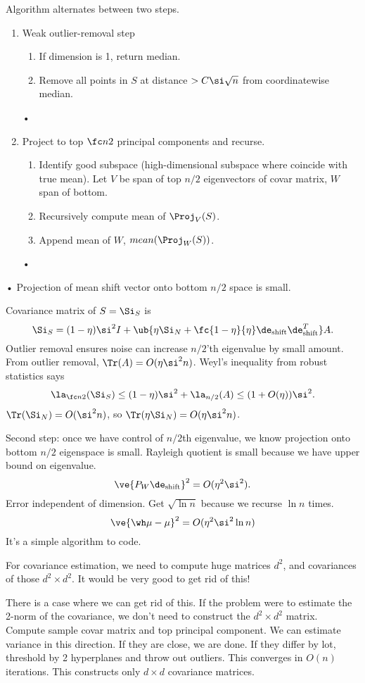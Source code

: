 Algorithm alternates between two steps.
\begin{enumerate}
\item
Weak outlier-removal step
\begin{enumerate}
\item
If dimension is 1, return median.
\item
Remove all points in $S$ at distance $>C\si \sqrt n$ from coordinatewise median. 
\end{enumerate}•
\item
Project to top $\fc n2$ principal components and recurse.
\begin{enumerate}
\item
Identify good subspace (high-dimensional subspace where coincide with true mean). Let $V$ be span of top $n/2$ eigenvectors of covar matrix, $W$ span of bottom. \item
Recursively compute mean of $\Proj_V(S)$.
\item
 Append mean of $W$, $mean(\Proj_W(S))$. 
\end{enumerate}•
\end{enumerate}•
Projection of mean shift vector onto bottom $n/2$ space is small.

Covariance matrix of $S=\Si_S$ is
$$
\Si_S = (1-\eta)\si^2 I + \ub{\eta \Si_N + \fc{1-\eta}{\eta} \de_{\text{shift}}\de_{\text{shift}}^T}A.
$$
Outlier removal ensures noise can increase $n/2$'th eigenvalue by small amount. 
From outlier removal, $\Tr(A)=O(\eta\si^2n)$.
Weyl's inequality from robust statistics says
$$
\la_{\fc n2}(\Si_S) \le (1-\eta)\si^2 + \la_{n/2}(A)
\le (1+O(\eta))\si^2.
$$
$\Tr(\Si_N) = O(\si^2n)$, so $\Tr(\eta\Si_N) = O(\eta\si^2n)$. 

Second step: once we have control of $n/2$th eigenvalue, we know projection onto bottom $n/2$ eigenspace is small. Rayleigh quotient is small because we have upper bound on eigenvalue. 
$$
\ve{P_W\de_{\text{shift}}}^2 = O(\eta^2\si^2).
$$
Error independent of dimension. Get $\sqrt{\ln n}$ because we recurse $\ln n$ times. 
$$
\ve{\wh\mu-\mu}^2 = O(\eta^2\si^2\ln n)
$$
It's a simple algorithm to code. 

For covariance estimation, we need to compute huge matrices $d^2$, and covariances of those $d^2\times d^2$. It would be very good to get rid of this!

There is a case where we can get rid of this. If the problem were to estimate the 2-norm of the covariance, we don't need to construct the $d^2\times d^2$ matrix.  Compute sample covar matrix and top principal component. We can estimate variance in this direction. If they are close, we are done. If they differ by lot, threshold by 2 hyperplanes and throw out outliers. This converges in $O(n)$ iterations. This constructs only $d\times d$ covariance matrices. %

